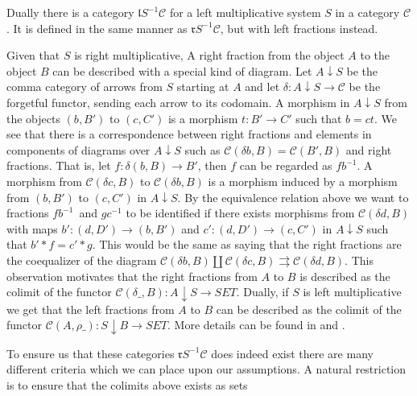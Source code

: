     \begin{remark}
        Dually there is a category $\mathfrak{l}S^{-1}\mathcal{C}$ for a left multiplicative system $S$ in a category $\mathcal{C}$. It is defined in the same manner as $\mathfrak{r}S^{-1}\mathcal{C}$, but with left fractions instead.
    \end{remark}

    \begin{remark}
         Given that $S$ is right multiplicative, A right fraction from the object $A$ to the object $B$ can be described with a special kind of diagram. Let $A\downarrow S$ be the comma category of arrows from $S$ starting at $A$ and let $\delta : A\downarrow S\rightarrow\mathcal{C}$ be the forgetful functor, sending each arrow to its codomain. A morphism in $A\downarrow S$ from the objects $(b,B')$ to $(c,C')$ is a morphism $t : B'\rightarrow C'$ such that $b=ct$. We see that there is a correspondence between right fractions and elements in components of diagrams over $A\downarrow S$ such as $\mathcal{C}(\delta b, B)=\mathcal{C}(B',B)$ and right fractions. That is, let $f:\delta(b, B)\rightarrow B'$, then $f$ can be regarded as $fb^{-1}$. A morphism from $\mathcal{C}(\delta c, B)$ to $\mathcal{C}(\delta b, B)$ is a morphism induced by a morphism from $(b,B')$ to $(c,C')$ in $A\downarrow S$. By the equivalence relation above we want to fractions $fb^{-1}$ and $gc^{-1}$ to be identified if there exists morphisms from $\mathcal{C}(\delta d, B)$ with maps $b' : (d,D')\rightarrow (b,B')$ and $c' : (d,D')\rightarrow (c,C')$ in $A\downarrow S$ such that $b'*f = c'*g$. This would be the same as saying that the right fractions are the coequalizer of the diagram $\mathcal{C}(\delta b, B)\coprod \mathcal{C}(\delta c, B)\rightrightarrows \mathcal{C}(\delta d, B)$. This observation motivates that the right fractions from $A$ to $B$ is described as the colimit of the functor $\mathcal{C}(\delta\_, B):A\downarrow S\rightarrow SET$. Dually, if $S$ is left multiplicative we get that the left fractions from $A$ to $B$ can be described as the colimit of the functor $\mathcal{C}(A, \rho\_):S\downarrow B\rightarrow SET$. More details can be found in \cite{zisman} and \cite{weibel}.
    \end{remark}

    To ensure us that these categories $\mathfrak{r}S^{-1}\mathcal{C}$ does indeed exist there are many different criteria which we can place upon our assumptions. A natural restriction is to ensure that the colimits above exists as sets

